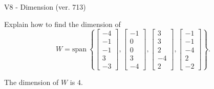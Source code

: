 \begin{exercise}
  \begin{exerciseTitle}V8 - Dimension (ver. 713)\end{exerciseTitle}
  \begin{exerciseStatement}
    Explain how to find the dimension of 
\[W=\mathrm{span}\ \left\{\left[\begin{array}{r}
-4 \\
-1 \\
-1 \\
3 \\
-3
\end{array}\right] , \left[\begin{array}{r}
-1 \\
0 \\
0 \\
3 \\
-4
\end{array}\right] , \left[\begin{array}{r}
3 \\
3 \\
2 \\
-4 \\
2
\end{array}\right] , \left[\begin{array}{r}
-1 \\
-1 \\
-4 \\
2 \\
-2
\end{array}\right]\right\}.\]



  \end{exerciseStatement}
  \begin{exerciseAnswer}
   The dimension of \(W\) is  \(4\).
  


  \end{exerciseAnswer}
\end{exercise}